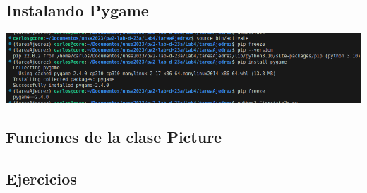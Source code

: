 \documentclass{article}
\begin{document}
\subsection{Instalando Pygame}
\begin{center}
	\includegraphics[scale=0.45]{img/Pygame.png}
\end{center}

\subsection{Funciones de la clase Picture}


\subsection{Ejercicios}







\end{document}
